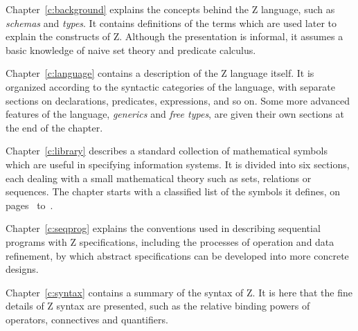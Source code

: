 Chapter~\ref{c:background} explains the concepts behind the Z
language, such as {\em schemas\/} and {\em types}. It contains
definitions of the terms which are used later to explain the
constructs of Z. Although the presentation is informal, it assumes a
basic knowledge of naive set theory and predicate calculus.

Chapter~\ref{c:language} contains a description of the Z language
itself. It is organized according to the syntactic categories of the
language, with separate sections on declarations, predicates,
expressions, and so on.  Some more advanced features of the language,
{\em generics\/} and {\em free types}, are given their own sections at
the end of the chapter.

Chapter~\ref{c:library} describes a standard collection of
mathematical symbols which are useful in specifying information
systems.  It is divided into six sections, each dealing with a small
mathematical theory such as sets, relations or sequences.  The chapter
starts with a classified list of the symbols it defines, on
pages~\pageref{p:symlist+} to~\pageref{p:symlist-}.

Chapter~\ref{c:seqprog} explains the conventions used in describing
sequential programs with Z specifications, including the processes of
operation and data refinement, by which abstract specifications can be
developed into more concrete designs.

Chapter~\ref{c:syntax} contains a summary of the syntax of Z. It is
here that the fine details of Z syntax are presented, such as the
relative binding powers of operators, connectives and quantifiers.

